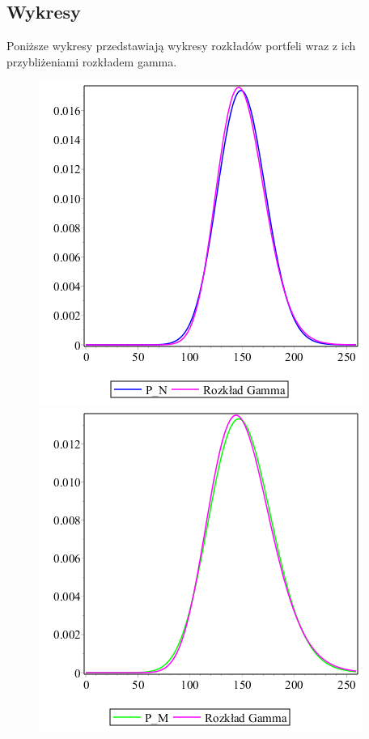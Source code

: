 \documentclass[12pt]{article}
\theoremstyle{twierdzenie}
\theoremstyle{definition}
\begin{document}
\subsection{Wykresy}
Poniższe wykresy przedstawiają wykresy rozkładów portfeli wraz z ich przybliżeniami rozkładem gamma.
\begin{figure}[H]
\includegraphics[scale=.5]{gammadlaN}
\includegraphics[scale=.5]{gammadlaM}
\begin{center}

\end{center}
\end{figure}
\end{document}
